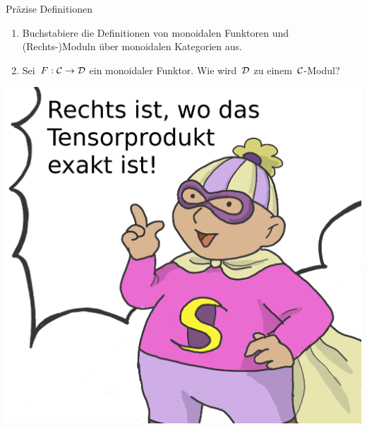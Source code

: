 \documentclass{uebblatt}
\begin{document}
\begin{aufgabe}{Präzise Definitionen}
\begin{enumerate}
\item Buchstabiere die Definitionen von monoidalen Funktoren und (Rechts-)Moduln über
monoidalen Kategorien aus.
\item Sei~$F : \mathcal{C} \to \mathcal{D}$ ein monoidaler Funktor. Wie
wird~$\mathcal{D}$ zu einem~$\mathcal{C}$-Modul?
\end{enumerate}
\end{aufgabe}

\centering
\includegraphics[scale=0.08]{images/rechts-ist-wo-das-tensorprodukt-exakt-ist}
\par
\end{document}
